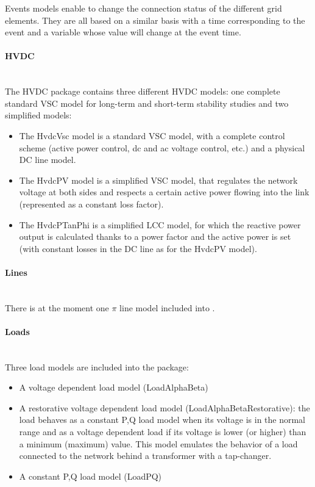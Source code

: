 \documentclass[a4paper, 12pt]{report}
\begin{document}
Events models enable to change the connection status of the different grid elements. They are all based on a similar basis with a time corresponding to the event and a variable whose value will change at the event time.

\paragraph{HVDC}
~~\\

The HVDC package contains three different HVDC models: one complete standard VSC model for long-term and short-term stability studies and two simplified models:
\begin{itemize}
\item The HvdcVsc model is a standard VSC model, with a complete control scheme (active power control, dc and ac voltage control, etc.) and a physical DC line model.
\item The HvdcPV model is a simplified VSC model, that regulates the network voltage at both sides and respects a certain active power flowing into the link (represented as a constant loss factor).
\item The HvdcPTanPhi is a simplified LCC model, for which the reactive power output is calculated thanks to a power factor and the active power is set (with constant losses in the DC line as for the HvdcPV model).
\end{itemize}


\paragraph{Lines}
~~\\

There is at the moment one $\pi$ line model included into \Dynawo.

\paragraph{Loads}
~~\\

Three load models are included into the package:
\begin{itemize}
\item A voltage dependent load model (LoadAlphaBeta)
\item A restorative voltage dependent load model (LoadAlphaBetaRestorative): the load behaves as a constant P,Q load model when its voltage is in the normal range and as a voltage dependent load if its voltage is lower (or higher) than a minimum (maximum) value. This model emulates the behavior of a load connected to the network behind a transformer with a tap-changer.
\item A constant P,Q load  model (LoadPQ)
\end{itemize}
\end{document}

